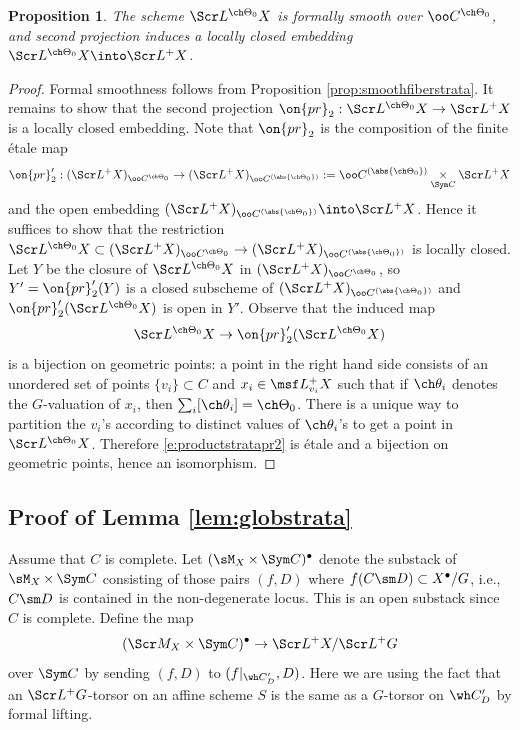 \documentclass[final]{amsart}
\newtheorem{prop}[subsubsection]{Proposition}
\theoremstyle{remark}
\theoremstyle{definition}
\DeclareMathOperator*{\xt}{\times}
\numberwithin{equation}{section}
\begin{document}
\begin{prop} \label{prop:smoothstrata}
The scheme $\Scr L^{\ch\Theta_0} X$ is formally smooth over $\oo C^{\ch\Theta_0}$,
and second projection induces a locally closed embedding $\Scr L^{\ch\Theta_0}X \into 
\Scr L^+ X$. 
\end{prop}
\begin{proof}
Formal smoothness follows from Proposition \ref{prop:smoothfiberstrata}. 
It remains to show that the second projection 
$\on{pr}_2 : \Scr L^{\ch\Theta_0} X \to \Scr L^+ X$
is a locally closed embedding. 
Note that $\on{pr}_2$ is the composition of the finite \'etale map 
\[ \on{pr}'_2: (\Scr L^+ X)_{\oo C^{\ch\Theta_0}} \to 
(\Scr L^+ X)_{\oo C^{( \abs{\ch\Theta_0})}} := \oo C^{(\abs{\ch\Theta_0})} \underset{\Sym C}\times \Scr L^+ X \]
and the open embedding $(\Scr L^+ X)_{\oo C^{(\abs{\ch\Theta_0})}} \into \Scr L^+ X$. 
Hence it suffices to show that the restriction 
$\Scr L^{\ch\Theta_0} X  \subset (\Scr L^+ X)_{\oo C^{\ch\Theta_0}} \to 
(\Scr L^+ X)_{\oo C^{(\abs{\ch\Theta_0})}}$
is locally closed.  
Let $Y$ be the closure of $\Scr L^{\ch\Theta_0} X$ in $(\Scr L^+ X)_{\oo C^{\ch\Theta_0}}$, 
so $Y'=\on{pr}'_2(Y)$ is 
a closed subscheme of $(\Scr L^+ X)_{\oo C^{(\abs{\ch\Theta_0})}}$
and $\on{pr}'_2(\Scr L^{\ch\Theta_0} X)$ is open in $Y'$. 
Observe that the induced map 
\begin{equation} \label{e:productstratapr2} 
\Scr L^{\ch\Theta_0} X \to \on{pr}'_2(\Scr L^{\ch\Theta_0} X)
\end{equation}
is a bijection on geometric points: 
a point in the right hand side consists of an unordered set of points $\{ v_i \} \subset C$
and $x_i \in \msf L^+_{v_i} X$ such that if $\ch\theta_i$ denotes the $G$-valuation
of $x_i$, then $\sum_i [\ch\theta_i] = \ch\Theta_0$. 
There is a unique way to partition the $v_i$'s according to distinct values of $\ch\theta_i$'s
to get a point in $\Scr L^{\ch\Theta_0} X$. 
Therefore \eqref{e:productstratapr2} is \'etale and a bijection on geometric points, hence
an isomorphism. 
\end{proof}

\subsection{Proof of Lemma {\ref{lem:globstrata}}}
\label{proof:globstrata}

Assume that $C$ is complete. 
Let $(\sM_X \xt \Sym C)^\bullet$ denote the substack of $\sM_X \xt\Sym C$
consisting of those pairs $(f,D)$ where $f(C \sm D) \subset X^\bullet/G$, i.e., 
$C\sm D$ is contained in the non-degenerate locus.
This is an open substack since $C$ is complete. 
Define the map
\begin{equation} \label{e:MtoLX}
    (\Scr M_X \times \Sym C)^\bullet \to \Scr L^+ X / \Scr L^+G
\end{equation}
over $\Sym C$ by sending $(f,D)$ to $(f|_{\wh C'_D}, D)$. 
Here we are using the fact that an $\Scr L^+G$-torsor on an affine scheme $S$
is the same as a $G$-torsor on $\wh C'_D$ by formal lifting. 
\end{document}
